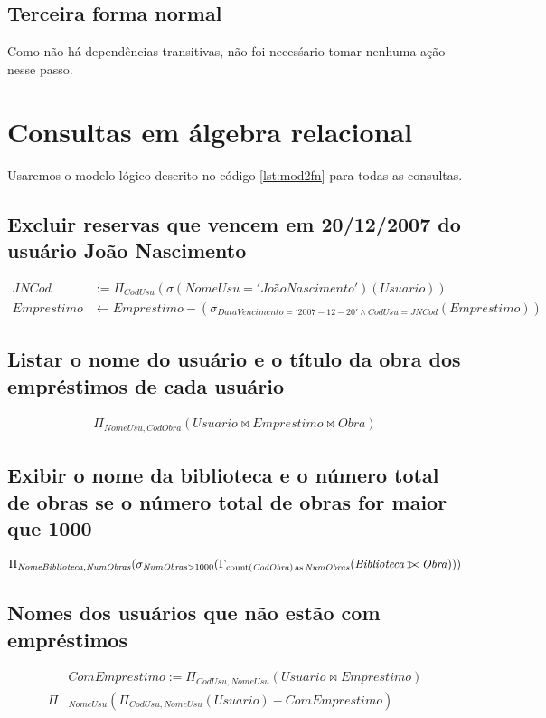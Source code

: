 \documentclass[12pt]{article}
\def\ojoin{\setbox0=\hbox{$\bowtie$}%
  \rule[-.02ex]{.25em}{.4pt}\llap{\rule[\ht0]{.25em}{.4pt}}}
\def\leftouterjoin{\mathbin{\ojoin\mkern-5.8mu\bowtie}}
\begin{document}
  \subsection{Terceira forma normal}
  Como não há dependências transitivas, não foi necesśario tomar nenhuma ação nesse passo.

\newpage

\section{Consultas em álgebra relacional}
Usaremos o modelo lógico descrito no código \ref{lst:mod2fn} para todas as consultas.

  \subsection{Excluir reservas que vencem em 20/12/2007 do usuário João Nascimento}
    \begin{align*}
\mathit{JNCod} &:= \Pi_{\mathit{CodUsu}}(\sigma(\mathit{NomeUsu} = \mathit{'João Nascimento'})(\mathit{Usuario})) \\
\mathit{Emprestimo} &\gets \mathit{Emprestimo} - (\sigma_{\mathit{DataVencimento} = \mathit{'2007-12-20'} \land \mathit{CodUsu} = \mathit{JNCod}}(\mathit{Emprestimo}))
    \end{align*}
  \subsection{Listar o nome do usuário e o título da obra dos empréstimos de cada usuário}
    \begin{align*}
\Pi_{\mathit{NomeUsu, CodObra}}(\mathit{Usuario} \bowtie \mathit{Emprestimo} \bowtie \mathit{Obra})
    \end{align*}
  \subsection{Exibir o nome da biblioteca e o número total de obras se o número total de obras for maior que 1000}
    \begin{align*}
\Pi_{\mathit{NomeBiblioteca}, \mathit{NumObras}}(\sigma_{\mathit{NumObras} > 1000}(\Gamma_{\operatorname{count}(\mathit{CodObra}) \operatorname{as} \mathit{NumObras}}(\mathit{Biblioteca} \leftouterjoin \mathit{Obra})))
    \end{align*}
  \subsection{Nomes dos usuários que não estão com empréstimos}
    \begin{align*}
      &\mathit{ComEmprestimo} := \Pi_{\mathit{CodUsu}, \mathit{NomeUsu}}(\mathit{Usuario} \bowtie \mathit{Emprestimo}) \\
      \Pi&_{\mathit{NomeUsu}}(\Pi_{\mathit{CodUsu}, \mathit{NomeUsu}}(\mathit{Usuario}) - \mathit{ComEmprestimo})
    \end{align*}
\end{document}
